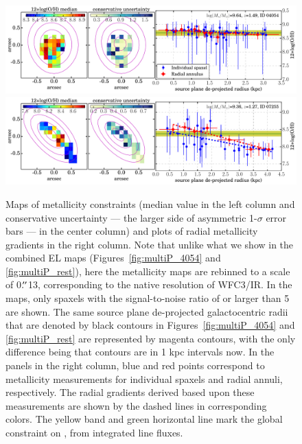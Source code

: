\begin{figure}
    \centering
    \includegraphics[width=\textwidth]{fig_oh12grad/clM1149_id04054.pdf}
    \includegraphics[width=\textwidth]{fig_oh12grad/clM1149_id07255.pdf}
    \caption[Sub-kpc resolution metallicity maps and radial gradients.]
    {Maps of metallicity constraints (median value in the left column and
    conservative uncertainty --- the larger side of asymmetric 1-$\sigma$ error bars --- in
    the center column) and plots of radial metallicity gradients in the right column. Note
    that unlike what we show in the combined EL maps (Figures~\ref{fig:multiP_4054} and
    \ref{fig:multiP_rest}), here the metallicity maps are rebinned to a scale of 0$\mbox{$.\!^{\prime\prime}$}$13,
    corresponding to the native resolution of WFC3/IR. In the maps, only spaxels with the
    signal-to-noise ratio of \Ha or \OIII larger than 5 are shown.  The same source plane
    de-projected galactocentric radii that are denoted by black contours in
    Figures~\ref{fig:multiP_4054} and \ref{fig:multiP_rest} are represented by magenta
    contours, with the only difference being that contours are in 1 kpc intervals now. In the
    panels in the right column, blue and red points correspond to metallicity measurements
    for individual spaxels and radial annuli, respectively.  The radial gradients derived
    based upon these measurements are shown by the dashed lines in corresponding colors.  The
    yellow band and green horizontal line mark the global constraint on \oh, from integrated
    line fluxes.}
    \label{fig:oh12grad}
\end{figure}

